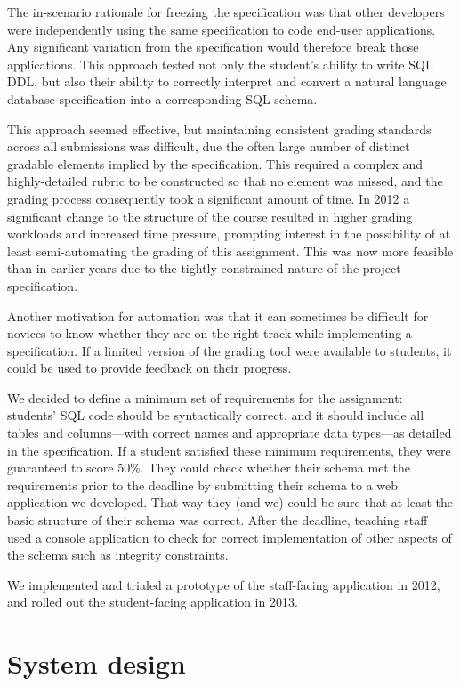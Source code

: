 \documentclass[sigconf, authordraft, capitalise]{acmart}
\begin{document}
The in-scenario rationale for freezing the specification was that other developers were independently using the same specification to code end-user applications. Any significant variation from the specification would therefore break those applications. This approach tested not only the student's ability to write SQL DDL, but also their ability to correctly interpret and convert a natural language database specification into a corresponding SQL schema.

This approach seemed effective, but maintaining consistent grading standards across all submissions was difficult, due the often large number of distinct gradable elements implied by the specification. This required a complex and highly-detailed rubric to be constructed so that no element was missed, and the grading process consequently took a significant amount of time. In 2012 a significant change to the structure of the course resulted in higher grading workloads and increased time pressure, prompting interest in the possibility of at least semi-automating the grading of this assignment. This was now more feasible than in earlier years due to the tightly constrained nature of the project specification.

Another motivation for automation was that it can sometimes be difficult for novices to know whether they are on the right track while implementing a specification. If a limited version of the grading tool were available to students, it could be used to provide feedback on their progress.

We decided to define a minimum set of requirements for the assignment: students' SQL code should be syntactically correct, and it should include all tables and columns---with correct names and appropriate data types---as detailed in the specification. If a student satisfied these minimum requirements, they were guaranteed to score 50\%. They could check whether their schema met the requirements prior to the deadline by submitting their schema to a web application we developed. That way they (and we) could be sure that at least the basic structure of their schema was correct. After the deadline, teaching staff used a console application to check for correct implementation of other aspects of the schema such as integrity constraints.

We implemented and trialed a prototype of the staff-facing application in 2012, and rolled out the student-facing application in 2013.


\section{System design}
\label{sec-design}
\end{document}
